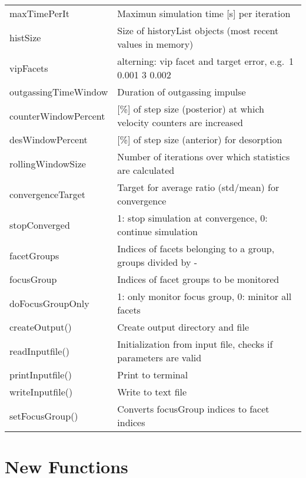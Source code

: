 \begin{center}
\begin{tabular}{|l|l|}
\rule{0pt}{3ex}  maxTimePerIt&  Maximun simulation time [s] per iteration\\
\rule{0pt}{3ex}  histSize&  Size of historyList objects (most recent values in memory)\\
\rule{0pt}{3ex}  vipFacets&  alterning: vip facet and target error, e.g.\ 1 0.001 3 0.002\\
\rule{0pt}{3ex}  outgassingTimeWindow&  Duration of outgassing impulse\\
\rule{0pt}{3ex}  counterWindowPercent&  [\%] of step size (posterior) at which velocity counters are increased\\
\rule{0pt}{3ex}  desWindowPercent&  [\%] of step size (anterior) for desorption\\
\rule{0pt}{3ex}  rollingWindowSize&  Number of iterations over which statistics are calculated\\
\rule{0pt}{3ex}  convergenceTarget&  Target for average ratio (std/mean) for convergence\\
\rule{0pt}{3ex}  stopConverged&  1: stop simulation at convergence, 0: continue simulation\\
\rule{0pt}{3ex}  facetGroups&  Indices of facets belonging to a group, groups divided by - \\
\rule{0pt}{3ex}  focusGroup& Indices of facet groups to be monitored\\
\rule{0pt}{3ex} doFocusGroupOnly& 1: only monitor focus group, 0: minitor all facets\\
\hline
\rule{0pt}{3ex} createOutput()& Create output directory and file\\
\rule{0pt}{3ex} readInputfile()& Initialization from input file, checks if parameters are valid\\
\rule{0pt}{3ex} printInputfile()& Print to terminal\\
\rule{0pt}{3ex} writeInputfile()& Write to text file\\
\rule{0pt}{3ex} setFocusGroup()& Converts focusGroup indices to facet indices\\
\hline
\end{tabular}
\end{center}
\section{New Functions}
